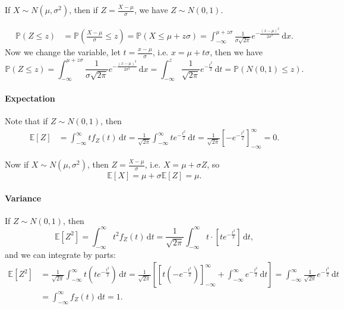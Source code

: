 \begin{claim}
    If \(X \sim N(\mu , \sigma ^2)\), then if \(Z = \frac{X - \mu}{\sigma}\), we have \(Z \sim N(0, 1)\).   
\end{claim}

\begin{explanation}
    \begin{align*}
        \mathbb{P} (Z \le z) &= \mathbb{P} \left( \frac{X - \mu}{\sigma} \le z \right) = \mathbb{P} (X \le \mu + z \sigma) = \int _{-\infty }^{\mu + z \sigma} \frac{1}{\sigma \sqrt{2 \pi} } e^{-\frac{(x - \mu )^2}{2 \sigma ^2}} \, \mathrm{d} x.  
    \end{align*}
    Now we change the variable, let \(t = \frac{x - \mu}{\sigma}\), i.e. \(x = \mu + t \sigma \), then we have 
    \[
        \mathbb{P} (Z \le z) = \int _{-\infty }^{\mu + z \sigma} \frac{1}{\sigma \sqrt{2 \pi} } e^{-\frac{(x - \mu )^2}{2 \sigma ^2}} \, \mathrm{d} x = \int _{-\infty }^z \frac{1}{\sqrt{2 \pi } } e^{-\frac{t^2}{2}} \, \mathrm{d} t = \mathbb{P} (N(0, 1) \le z).  
    \]  
\end{explanation}

\paragraph{Expectation}
Note that if \(Z \sim N(0, 1)\), then 
\begin{align*}
    \mathbb{E} [Z] &= \int _{-\infty }^{\infty } t f_Z(t) \, \mathrm{d} t = \frac{1}{\sqrt{2 \pi } } \int _{-\infty }^{\infty } t e^{-\frac{t^2}{2}} \, \mathrm{d} t = \frac{1}{\sqrt{2 \pi} } \left[ - e^{-\frac{t^2}{2}} \right]_{-\infty}^{\infty} = 0.   
\end{align*} 

Now if \(X \sim N(\mu , \sigma ^2)\), then \(Z = \frac{X - \mu}{\sigma}\), i.e. \(X = \mu + \sigma Z\), so 
\[
    \mathbb{E} [X] = \mu + \sigma \mathbb{E} [Z] = \mu .
\]   

\paragraph{Variance}
If \(Z \sim N(0, 1)\), then 
\[
    \mathbb{E} [Z^2] = \int _{-\infty }^{\infty } t^2 f_Z(t) \, \mathrm{d} t = \frac{1}{\sqrt{2 \pi } } \int _{-\infty }^{\infty } t \cdot \left[ t e^{-\frac{t^2}{2}} \right] \, \mathrm{d} t,   
\] 
and we can integrate by parts: 
\begin{align*}
    \mathbb{E} [Z^2] &= \frac{1}{\sqrt{2 \pi}} \int _{-\infty }^{\infty } t \left( t e^{-\frac{t^2}{2}} \right) \, \mathrm{d} t = \frac{1}{\sqrt{2 \pi} } \left[ \left[ t(-e^{-\frac{t^2}{2}}) \right]_{-\infty }^{\infty } + \int _{-\infty }^{\infty } e^{-\frac{t^2}{2}} \, \mathrm{d} t  \right] = \int _{-\infty }^{\infty } \frac{1}{\sqrt{2 \pi} } e^{-\frac{t^2}{2}} \, \mathrm{d} t \\ &= \int _{-\infty }^{\infty} f_Z(t) \, \mathrm{d} t = 1.  
\end{align*}

